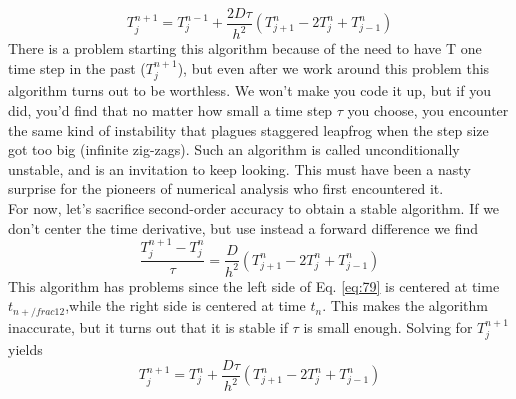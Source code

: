 \begin{equation}\label{eq:78}
T_{j}^{n+1}=T_{j}^{n-1}+\frac{2 D \tau}{h^{2}}\left(T_{j+1}^{n}-2 T_{j}^{n}+T_{j-1}^{n}\right)
\end{equation}
There is a problem starting this algorithm because of the need to have T one time
step in the past ($T_j^{n+1}$), but even after we work around this problem this algorithm
turns out to be worthless. We won\rq t make you code it up, but if you did, you\rq d
find that no matter how small a time step $\tau$ you choose, you encounter the same
kind of instability that plagues staggered leapfrog when the step size got too big
(infinite zig-zags). Such an algorithm is called unconditionally unstable, and is an
invitation to keep looking. This must have been a nasty surprise for the pioneers
of numerical analysis who first encountered it. \\ 
For now, let\rq s sacrifice second-order accuracy to obtain a stable algorithm. If
we don\rq t center the time derivative, but use instead a forward difference we find
\begin{equation}\label{eq:79}
\frac{T_{j}^{n+1}-T_{j}^{n}}{\tau}=\frac{D}{h^{2}}\left(T_{j+1}^{n}-2 T_{j}^{n}+T_{j-1}^{n}\right)
\end{equation}
This algorithm has problems since the left side of Eq. \eqref{eq:79} is centered at time $t_{n+/frac{1}{2}}$,while the right side is centered at time $t_n$. This makes the algorithm inaccurate, but it turns out that it is stable if $\tau$ is small enough. Solving for $T_j^{n+1}$ yields
\begin{equation}\label{eq:710}
T_{j}^{n+1}=T_{j}^{n}+\frac{D \tau}{h^{2}}\left(T_{j+1}^{n}-2 T_{j}^{n}+T_{j-1}^{n}\right)
\end{equation}
